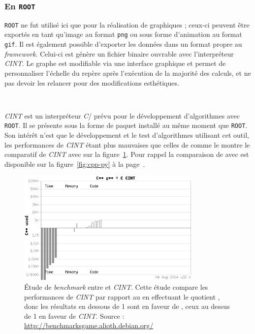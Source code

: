 		\subsubsection{En \texttt{ROOT}}

\texttt{ROOT} ne fut utilisé ici que pour la réalisation de graphiques ; ceux-ci peuvent être exportés en tant qu'image au format \texttt{png} ou sous forme d'animation au format \texttt{gif}. Il est également possible d'exporter les données dans un format propre au \emph{framework}. Celui-ci est génère un fichier binaire ouvrable avec l'interpréteur \emph{CINT}. Le graphe est modifiable via une interface graphique et permet de personnaliser l'échelle du repère après l'exécution de la majorité des calculs, et ne pas devoir les relancer pour des modifications esthétiques.

\

\emph{CINT} est un interpréteur \emph{C}/\Cpp{} prévu pour le développement d'algorithmes avec \texttt{ROOT}. Il se présente sous la forme de paquet installé au même moment que \texttt{ROOT}. Son intérêt n'est que le développement et le test d'algorithmes utilisant cet outil, les performances de \emph{CINT} étant plus mauvaises que celles de \Python{} comme le montre le comparatif de \emph{CINT} avec \Cpp{} sur la figure~\ref{fig:cpp-cint}. Pour rappel la comparaison de \Cpp{} avec \Python{} est disponible sur la figure~\ref{fig:cpp-py} à la page~\pageref{fig:cpp-py}.

	\begin{figure}[h]
		\centering
		\includegraphics[width=0.8\textwidth]{img/cpp-cint.png}
		\caption[\emph{Benchmark} entre \Cpp{} et \emph{CINT}]{Étude de \emph{benchmark} entre \Cpp{} et \emph{CINT}. Cette étude compare les performances de \emph{CINT} par rapport au \Cpp{} en effectuant le quotient , donc les résultats en dessous de 1 sont en faveur de \Cpp{}, ceux au dessus de 1 en faveur de \emph{CINT}. Source : \url{http://benchmarksgame.alioth.debian.org/}}
		\label{fig:cpp-cint}
	\end{figure}

